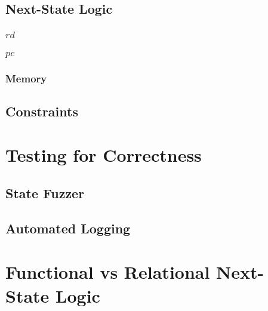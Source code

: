 


\subsection{Next-State Logic}
\subsubsection{$rd$}
\subsubsection{$pc$}
\subsubsection{Memory}
\subsection{Constraints}
\section{Testing for Correctness}\label{sec:corectness}
\subsection{State Fuzzer}
\subsection{Automated Logging}

\section{Functional vs Relational Next-State Logic}\label{sec:funcVSrel}